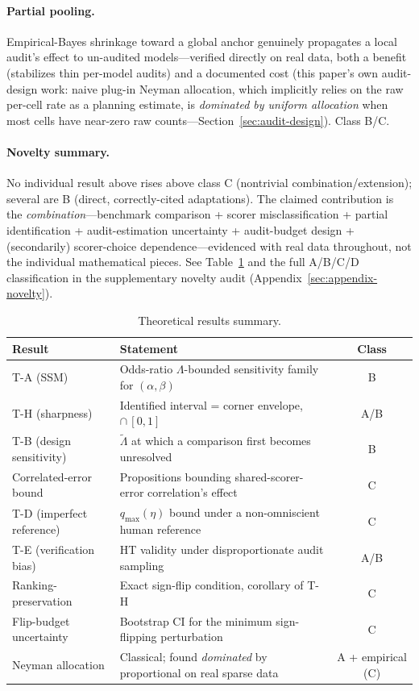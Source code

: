 \paragraph{Partial pooling.} Empirical-Bayes shrinkage toward a global
anchor genuinely propagates a local audit's effect to un-audited
models---verified directly on real data, both a benefit (stabilizes thin
per-model audits) and a documented cost (this paper's own audit-design work:
naive plug-in Neyman allocation, which implicitly relies on the raw per-cell
rate as a planning estimate, is \emph{dominated by uniform allocation} when
most cells have near-zero raw counts---Section~\ref{sec:audit-design}).
Class B/C.

\paragraph{Novelty summary.} No individual result above rises above class C
(nontrivial combination/extension); several are B (direct, correctly-cited
adaptations). The claimed contribution is the \emph{combination}---benchmark
comparison + scorer misclassification + partial identification +
audit-estimation uncertainty + audit-budget design + (secondarily)
scorer-choice dependence---evidenced with real data throughout, not the
individual mathematical pieces. See Table~\ref{tab:theory-summary} and the
full A/B/C/D classification in the supplementary novelty audit
(Appendix~\ref{sec:appendix-novelty}).

\begin{table}[t]
  \centering
  \caption{Theoretical results summary.}
  \label{tab:theory-summary}
  \small
  \begin{tabular}{@{}p{3.1cm}p{7.3cm}c@{}}
    \toprule
    Result & Statement & Class \\
    \midrule
    T-A (SSM) & Odds-ratio $\Lambda$-bounded sensitivity family for $(\alpha,\beta)$ & B \\
    T-H (sharpness) & Identified interval = corner envelope, $\cap\,[0,1]$ & A/B \\
    T-B (design sensitivity) & $\tilde\Lambda$ at which a comparison first becomes unresolved & B \\
    Correlated-error bound & Propositions bounding shared-scorer-error correlation's effect & C \\
    T-D (imperfect reference) & $q_{\max}(\eta)$ bound under a non-omniscient human reference & C \\
    T-E (verification bias) & HT validity under disproportionate audit sampling & A/B \\
    Ranking-preservation & Exact sign-flip condition, corollary of T-H & C \\
    Flip-budget uncertainty & Bootstrap CI for the minimum sign-flipping perturbation & C \\
    Neyman allocation & Classical; found \emph{dominated} by proportional on real sparse data & A + empirical (C) \\
    \bottomrule
  \end{tabular}
\end{table}

